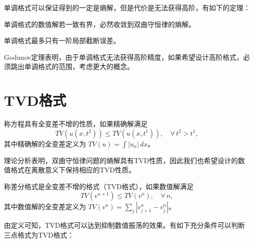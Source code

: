 单调格式可以保证得到的一定是熵解，但是代价是无法获得高阶，有如下的定理：

\begin{theorem}
    单调格式的数值解若一致有界，必然收敛到双曲守恒律的熵解。
\end{theorem}

\begin{theorem}[Godunov]
    单调格式最多只有一阶局部截断误差。
\end{theorem}

Godunov定理表明，由于单调格式无法获得高阶精度，如果希望设计高阶格式，必须跳出单调格式的范围，考虑更大的概念。

\section{TVD格式}

\begin{definition}
    称方程具有全变差不增的性质，如果精确解满足
    \[
        TV(u(x,t^2)) \le TV(u(x,t^1)), \quad \forall\, t^2 > t^1,
    \]
    其中精确解的全变差定义为 $TV(u) = \int |u_x|\,dx$。
\end{definition}

理论分析表明，双曲守恒律问题的熵解具有TVD性质，因此我们也希望设计的数值格式在离散意义下保持相应的TVD性质。
\begin{definition}[TVD格式]
    称差分格式是全变差不增的格式（TVD格式），如果数值解满足
    \[
        TV(v^{n+1}) \le TV(v^n),\quad \forall\, n,
    \]
    其中数值解的全变差定义为 $TV(v^n) = \sum_j |v^n_{j+1} - v^n_j|$。
\end{definition}

由定义可知，TVD格式可以达到抑制数值振荡的效果。有如下充分条件可以判断三点格式为TVD格式：

